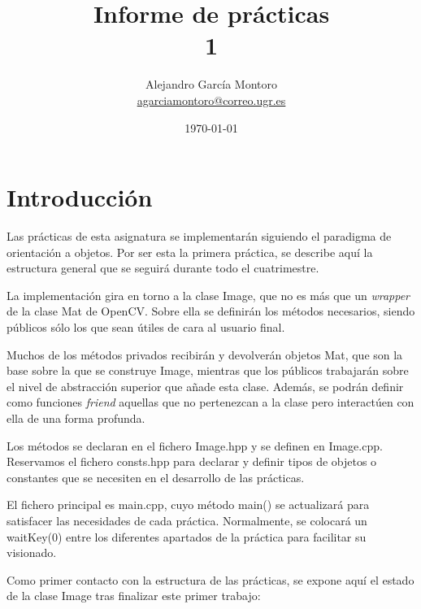 \documentclass[a4paper, 11pt]{article}
\title{Informe de prácticas \\ 1}
\author{Alejandro García Montoro\\
    \href{mailto:agarciamontoro@correo.ugr.es}{agarciamontoro@correo.ugr.es}}
\date{\today}
\theoremstyle{definition}
\theoremstyle{theorem}
\begin{document}
  \maketitle

  \section{Introducción}

  Las prácticas de esta asignatura se implementarán siguiendo el paradigma de orientación a objetos. Por ser esta la primera práctica, se describe aquí la estructura general que se seguirá durante todo el cuatrimestre.

  La implementación gira en torno a la clase Image, que no es más que un \emph{wrapper} de la clase Mat de OpenCV. Sobre ella se definirán los métodos necesarios, siendo públicos sólo los que sean útiles de cara al usuario final.

  Muchos de los métodos privados recibirán y devolverán objetos Mat, que son la base sobre la que se construye Image, mientras que los públicos trabajarán sobre el nivel de abstracción superior que añade esta clase. Además, se podrán definir como funciones \emph{friend} aquellas que no pertenezcan a la clase pero interactúen con ella de una forma profunda.

  Los métodos se declaran en el fichero Image.hpp y se definen en Image.cpp. Reservamos el fichero consts.hpp para declarar y definir tipos de objetos o constantes que se necesiten en el desarrollo de las prácticas.

  El fichero principal es main.cpp, cuyo método main() se actualizará para satisfacer las necesidades de cada práctica. Normalmente, se colocará un waitKey(0) entre los diferentes apartados de la práctica para facilitar su visionado.

  Como primer contacto con la estructura de las prácticas, se expone aquí el estado de la clase Image tras finalizar este primer trabajo:
\end{document}
